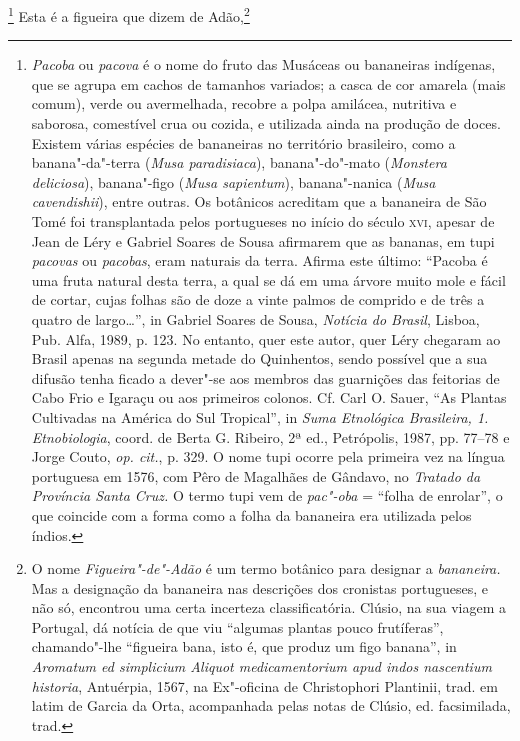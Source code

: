 \begin{linenumbers}
\footnote{ \textit{Pacoba} ou \textit{pacova} é o
nome do fruto das Musáceas ou bananeiras indígenas, que se agrupa em
cachos de tamanhos variados; a casca de cor amarela (mais comum), verde
ou avermelhada, recobre a polpa amilácea, nutritiva e saborosa,
comestível crua ou cozida, e utilizada ainda na produção de doces.
Existem várias espécies de bananeiras no território brasileiro, como a
banana"-da"-terra (\textit{Musa paradisiaca}), banana"-do"-mato
(\textit{Monstera deliciosa}), banana"-figo (\textit{Musa sapientum}), 
banana"-nanica (\textit{Musa cavendishii}), entre outras. Os botânicos
acreditam que a bananeira de São Tomé foi transplantada pelos
portugueses no início do século \textsc{xvi}, apesar de Jean de Léry e Gabriel
Soares de Sousa afirmarem que as bananas, em tupi \textit{pacovas} ou
\textit{pacobas}, eram naturais da terra. Afirma este último: ``Pacoba é
uma fruta natural desta terra, a qual se dá em uma árvore muito mole e
fácil de cortar, cujas folhas são de doze a vinte palmos de comprido e
de três a quatro de largo\ldots{}'', in Gabriel Soares de Sousa,
\textit{Notícia do Brasil}, Lisboa, Pub. Alfa, 1989, p. 123. No
entanto, quer este autor, quer Léry chegaram ao Brasil apenas na
segunda metade do Quinhentos, sendo possível que a sua difusão tenha
ficado a dever"-se aos membros das guarnições das feitorias de Cabo Frio
e Igaraçu ou aos primeiros colonos. Cf. Carl O. Sauer, ``As Plantas
Cultivadas na América do Sul Tropical'', in \textit{Suma Etnológica
Brasileira, 1. Etnobiologia}, coord. de Berta G. Ribeiro, 2ª ed.,
Petrópolis, 1987, pp. 77--78 e Jorge Couto, \textit{op. cit.}, p. 329. O
nome tupi ocorre pela primeira vez na língua portuguesa em 1576, com
Pêro de Magalhães de Gândavo, no \textit{Tratado da Província Santa Cruz.}
O termo tupi vem de \textit{pac"-oba} = ``folha de enrolar'', o que
coincide com a forma como a folha da bananeira era utilizada pelos
índios.} Esta é a figueira que dizem de Adão,\footnote{ O
nome \textit{Figueira"-de"-Adão} é um termo botânico para designar a
\textit{bananeira.} Mas a designação da bananeira nas descrições dos
cronistas portugueses, e não só, encontrou uma certa incerteza
classificatória. Clúsio, na sua viagem a Portugal, dá notícia de que
viu ``algumas plantas pouco frutíferas'', chamando"-lhe ``figueira bana,
isto é, que produz um figo banana'', in \textit{Aromatum ed simplicium
Aliquot medicamentorium apud indos nascentium historia}, Antuérpia,
1567, na Ex"-oficina de Christophori Plantinii, trad. em latim de Garcia
da Orta, acompanhada pelas notas de Clúsio, ed. facsimilada, trad.
}
\end{linenumbers}
